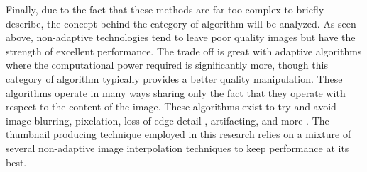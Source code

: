 Finally, due to the fact that these methods are far too complex to briefly describe, the concept behind the category of algorithm will be analyzed. As seen above, non-adaptive technologies tend to leave poor quality images but have the strength of excellent performance. The trade off is great with adaptive algorithms where the computational power required is significantly more, though this category of algorithm typically provides a better quality manipulation. These algorithms operate in many ways sharing only the fact that they operate with respect to the content of the image. \cite{Wu:2007:NII:1777454.1777548} These algorithms exist to try and avoid image blurring, pixelation, loss of edge detail \cite{Centeno:2012:CAA:2245276.2245290}, artifacting, and more \cite{Acharya:2007}. The thumbnail producing technique employed in this research relies on a mixture of several non-adaptive image interpolation techniques to keep performance at its best.